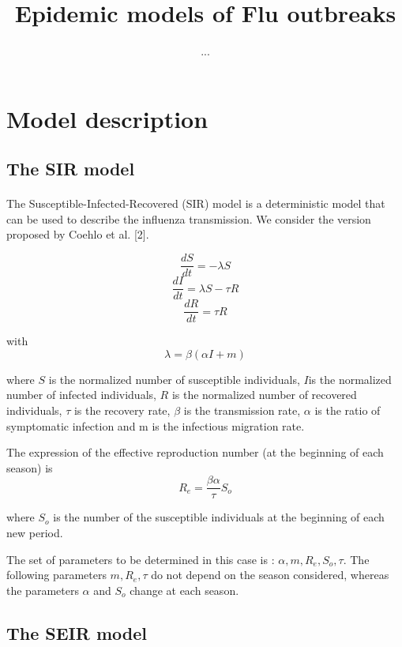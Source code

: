 \documentclass[11pt, a4paper]{article}
\author{...}
\title{Epidemic models of Flu outbreaks}
\begin{document}
\maketitle

\section{Model description}
\subsection{The SIR model}
\paragraph{}
The Susceptible-Infected-Recovered (SIR) model is a deterministic model that can be used to describe the influenza transmission. We consider the version proposed by Coehlo et al. [2].

\begin{equation}
\frac{dS}{dt} = - \lambda S
\end{equation}
\begin{equation}
\frac{dI}{dt} = \lambda S - \tau R
\end{equation}
\begin{equation}
\frac{dR}{dt} = \tau R
\end{equation}

with \[ \lambda = \beta (\alpha I + m) \]

where $S$ is the normalized number of susceptible individuals, $I$is the normalized number of infected individuals, $R$ is the normalized number of recovered individuals, $\tau $ is the recovery rate, $\beta $ is the transmission rate, $\alpha$ is the ratio of symptomatic infection and m is the infectious migration rate.

The expression of the effective reproduction number (at the beginning of each season) is 
\begin{equation}
R_e = \frac{\beta \alpha}{\tau} S_o
\end{equation}

where $S_o$ is the number of the susceptible individuals at the beginning of each new period.

The set of parameters to be determined in this case is : $ { \alpha, m, R_e, S_o, \tau }$. The following parameters $m, R_e, \tau$ do not depend on the season considered, whereas the parameters $\alpha$ and $S_o$ change at each season.

\subsection{The SEIR model}
\end{document}
